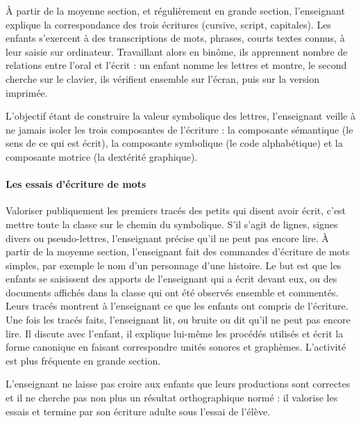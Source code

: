À partir de la moyenne section, et régulièrement en grande section, l’enseignant explique la correspondance des trois écritures (cursive, script, capitales). Les enfants s’exercent à des transcriptions de mots, phrases, courts textes connus, à leur saisie sur ordinateur. Travaillant alors en binôme, ils apprennent nombre de relations entre l’oral et l’écrit : un enfant nomme les lettres et montre, le second cherche sur le clavier, ils vérifient ensemble sur l’écran, puis sur la version imprimée.

L’objectif étant de construire la valeur symbolique des lettres, l’enseignant veille à ne jamais isoler les trois composantes de l’écriture : la composante sémantique (le sens de ce qui est écrit), la composante symbolique (le code alphabétique) et la composante motrice (la dextérité graphique).

\paragraph{Les essais d’écriture de mots}
Valoriser publiquement les premiers tracés des petits qui disent avoir écrit, c’est mettre toute la classe sur le chemin du symbolique. S’il s’agit de lignes, signes divers ou pseudo-lettres, l’enseignant précise qu’il ne peut pas encore lire. À partir de la moyenne section, l’enseignant fait des commandes d’écriture de mots simples, par exemple le nom d’un personnage d’une histoire. Le but est que les enfants se saisissent des apports de l’enseignant qui a écrit devant eux, ou des documents affichés dans la classe qui ont été observés ensemble et commentés. Leurs tracés montrent à l’enseignant ce que les enfants ont compris de l’écriture. Une fois les tracés faits, l’enseignant lit, ou bruite ou dit qu’il ne peut pas encore lire. Il discute avec l’enfant, il explique lui-même les procédés utilisés et écrit la forme canonique en faisant correspondre unités sonores et graphèmes. L’activité est plus fréquente en grande section.

L’enseignant ne laisse pas croire aux enfants que leurs productions sont correctes et il ne cherche pas non plus un résultat orthographique normé : il valorise les essais et termine par son écriture adulte sous l’essai de l’élève. 

